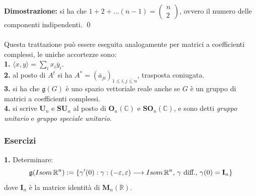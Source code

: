 \documentclass{article}
\begin{document}
\textbf{Dimostrazione:} si ha che $1 + 2 + \dots (n - 1) = \begin{pmatrix}
    n \\
    2
\end{pmatrix}$, ovvero il numero delle componenti indipendenti. \qed \\ \\
Questa trattazione può essere eseguita analogamente per matrici a coefficienti complessi, le uniche accortezze sono: \\
\textbf{1.} $\langle x, y \rangle = \sum_i x_i \overline{y}_i$. \\
\textbf{2.} al posto di $A^t$ si ha $A^* = (\overline{a}_{ji})_{1 \leq i, j \leq n}$, trasposta coniugata. \\
\textbf{3.} si ha che $\mathfrak{g}(G)$ è uno spazio vettoriale reale anche se $G$ è un gruppo di matrici a coefficienti complessi. \\
\textbf{4.} si scrive $\mathbf{U}_n$ e $\mathbf{SU}_n$ al posto di $\mathbf{O}_n(\mathbb{C})$ e $\mathbf{SO}_n(\mathbb{C})$, e sono detti \textit{gruppo unitario} e \textit{gruppo speciale unitario}.

\subsubsection{Esercizi}
\textbf{1.} Determinare: 
\begin{equation}
    \mathfrak{g}(Isom\, \mathbb{R}^n) := \{ \gamma ' (0) : \gamma : (- \varepsilon, \varepsilon) \longrightarrow Isom\, \mathbb{R}^n, \, \gamma \text{ diff.}, \, \gamma(0) = \mathbf{I}_n \} \notag
\end{equation} 
dove $\mathbf{I}_n$ è la matrice identità di $\mathbf{M}_n(\mathbb{R})$. \\
\end{document}
